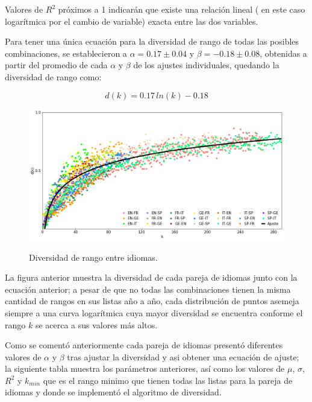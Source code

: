 Valores de $R^{2}$ próximos a 1 indicarán que existe una relación lineal ( en este caso logarítmica por el cambio de variable) exacta entre las dos variables.

Para tener una única ecuación para la diversidad de rango de todas las posibles  combinaciones, se establecieron a $\alpha = 0.17\pm 0.04$ y $\beta = -0.18 \pm 0.08$, obtenidas a partir del promedio de cada $\alpha$ y $\beta$ de los ajustes individuales, quedando la diversidad de rango como:

\begin{equation}
	\label{ec.gen_ajs}
	d(k) = 0.17\,ln(k) - 0.18
\end{equation} 




\clearpage

\begin{figure}[h!]
	\centering
	\includegraphics[scale=.39]{Cap_6/DR_gen.png}
	\label{fig.DR_gen}
	\caption{Diversidad de rango entre idiomas.}
\end{figure}
 

La figura anterior muestra la diversidad de cada pareja de idiomas junto con la ecuación anterior; a pesar de que no todas las combinaciones tienen la misma cantidad de rangos en sus listas año a año, cada distribución de puntos asemeja siempre a una curva logarítmica cuya mayor diversidad se encuentra conforme el rango $k$ se acerca a sus valores más altos.

Como se comentó anteriormente cada pareja de idiomas presentó diferentes valores de $\alpha$ y $\beta$ tras ajustar la diversidad y asi obtener una ecuación de ajuste; la siguiente tabla muestra los parámetros anteriores, así como los valores de $\mu$, $\sigma$, $R^{2}$ y $k_{min}$ que es el rango minimo que tienen todas las listas para la pareja de idiomas y donde se implementó el algoritmo de diversidad.

